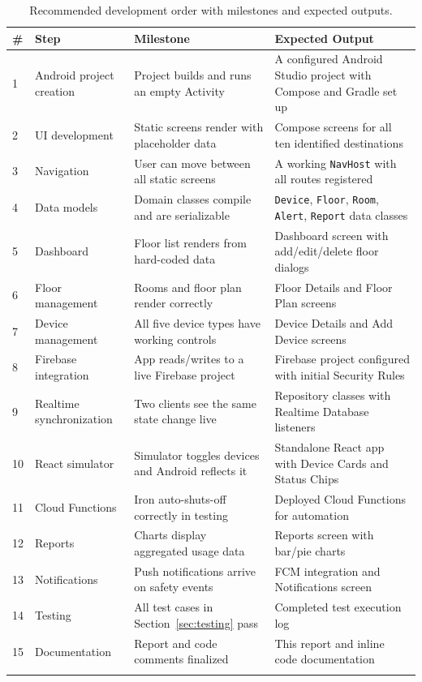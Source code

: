 \documentclass[11pt,a4paper]{article}
\begin{document}
\begin{longtable}{@{}p{0.6cm}p{3.0cm}p{4.6cm}p{4.6cm}@{}}
\toprule
\textbf{\#} & \textbf{Step} & \textbf{Milestone} & \textbf{Expected Output} \\
\midrule
\endhead
1 & Android project creation & Project builds and runs an empty Activity & A configured Android Studio project with Compose and Gradle set up \\
2 & UI development & Static screens render with placeholder data & Compose screens for all ten identified destinations \\
3 & Navigation & User can move between all static screens & A working \texttt{NavHost} with all routes registered \\
4 & Data models & Domain classes compile and are serializable & \texttt{Device}, \texttt{Floor}, \texttt{Room}, \texttt{Alert}, \texttt{Report} data classes \\
5 & Dashboard & Floor list renders from hard-coded data & Dashboard screen with add/edit/delete floor dialogs \\
6 & Floor management & Rooms and floor plan render correctly & Floor Details and Floor Plan screens \\
7 & Device management & All five device types have working controls & Device Details and Add Device screens \\
8 & Firebase integration & App reads/writes to a live Firebase project & Firebase project configured with initial Security Rules \\
9 & Realtime synchronization & Two clients see the same state change live & Repository classes with Realtime Database listeners \\
10 & React simulator & Simulator toggles devices and Android reflects it & Standalone React app with Device Cards and Status Chips \\
11 & Cloud Functions & Iron auto-shuts-off correctly in testing & Deployed Cloud Functions for automation \\
12 & Reports & Charts display aggregated usage data & Reports screen with bar/pie charts \\
13 & Notifications & Push notifications arrive on safety events & FCM integration and Notifications screen \\
14 & Testing & All test cases in Section~\ref{sec:testing} pass & Completed test execution log \\
15 & Documentation & Report and code comments finalized & This report and inline code documentation \\
\bottomrule
\caption{Recommended development order with milestones and expected outputs.}
\label{tab:dev-order}
\end{longtable}
\end{document}
